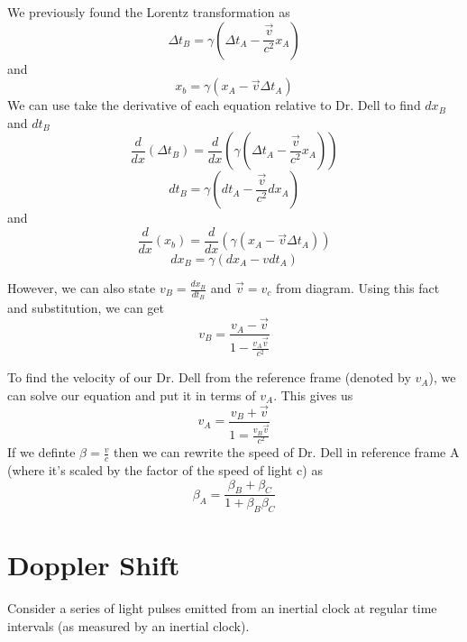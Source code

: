 \documentclass{article}
\begin{document}
We previously found the Lorentz transformation as
\[
  \Delta t_B = \gamma (\Delta t_A - \frac{\vec{v}}{c^2} x_A)
\]
and
\[
  x_b = \gamma (x_A - \vec{v} \Delta t_A)
\]
We can use take the derivative of each equation relative to Dr. Dell to find \(dx_B\) and \(dt_B\)
\[
  \frac{d}{dx}(\Delta t_B) = \frac{d}{dx}(\gamma (\Delta t_A - \frac{\vec{v}}{c^2} x_A))
\]
\[
  dt_B = \gamma (dt_A - \frac{\vec{v}}{c^2} dx_A)
\]
and
\[
  \frac{d}{dx}(x_b) = \frac{d}{dx}(\gamma (x_A - \vec{v} \Delta t_A))
\]
\[
  dx_B = \gamma (dx_A - vdt_A)
\]

However, we can also state \(v_B = \frac{dx_B}{dt_B}\) and \(\vec{v} = v_c\) from diagram. Using this fact and substitution, we can get
\[
  v_B = \frac{v_A - \vec{v}}{1 - \frac{v_A \vec{v}}{c^2}}
\]

To find the velocity of our Dr. Dell from the reference frame (denoted by \(v_A\)), we can solve our equation and put it in terms of \(v_A\). This gives us
\[
  v_A = \frac{v_B + \vec{v}}{1 = \frac{v_B \vec{v}}{c^2}}
\]
If we definte \(\beta = \frac{v}{c}\) then we can rewrite the speed of Dr. Dell in reference frame A (where it's scaled by the factor of the speed of light c) as
\[
\beta_A = \frac{\beta_B + \beta_C}{1 + \beta_B \beta_C}
\]
\newpage
\section{Doppler Shift}
Consider a series of light pulses emitted from an inertial clock at regular time intervals (as measured by an inertial clock).
\end{document}
